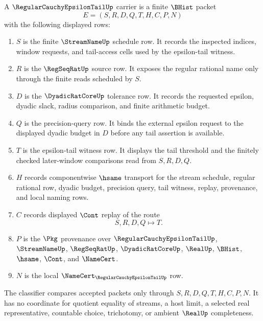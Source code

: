 \begin{definition}
\label{def:regular-cauchy-epsilon-tail-carrier}
A $\RegularCauchyEpsilonTailUp$ carrier is a finite $\BHist$ packet
$$
E=(S,R,D,Q,T,H,C,P,N)
$$
with the following displayed rows:
\begin{enumerate}
\item $S$ is the finite $\StreamNameUp$ schedule row. It records the inspected indices, window requests, and tail-access cells used by the epsilon-tail witness.
\item $R$ is the $\RegSeqRatUp$ source row. It exposes the regular rational name only through the finite reads scheduled by $S$.
\item $D$ is the $\DyadicRatCoreUp$ tolerance row. It records the requested epsilon, dyadic slack, radius comparison, and finite arithmetic budget.
\item $Q$ is the precision-query row. It binds the external epsilon request to the displayed dyadic budget in $D$ before any tail assertion is available.
\item $T$ is the epsilon-tail witness row. It displays the tail threshold and the finitely checked later-window comparisons read from $S,R,D,Q$.
\item $H$ records componentwise $\hsame$ transport for the stream schedule, regular rational row, dyadic budget, precision query, tail witness, replay, provenance, and local naming rows.
\item $C$ records displayed $\Cont$ replay of the route
$$
S,R,D,Q \longmapsto T .
$$
\item $P$ is the $\Pkg$ provenance over $\RegularCauchyEpsilonTailUp$, $\StreamNameUp$, $\RegSeqRatUp$, $\DyadicRatCoreUp$, $\RealUp$, $\BHist$, $\hsame$, $\Cont$, and $\NameCert$.
\item $N$ is the local $\NameCert_{\RegularCauchyEpsilonTailUp}$ row.
\end{enumerate}
The classifier compares accepted packets only through $S,R,D,Q,T,H,C,P,N$. It has no coordinate for quotient equality of streams, a host limit, a selected real representative, countable choice, trichotomy, or ambient $\RealUp$ completeness.
\end{definition}

